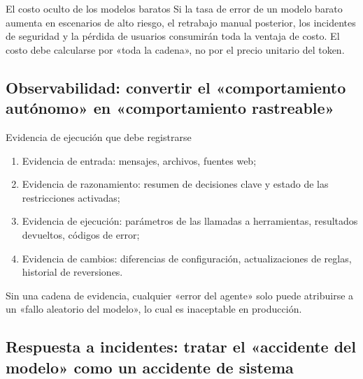 \begin{warningbox}{El costo oculto de los modelos baratos}
Si la tasa de error de un modelo barato aumenta en escenarios de alto riesgo, el retrabajo manual posterior, los incidentes de seguridad y la pérdida de usuarios consumirán toda la ventaja de costo. El costo debe calcularse por «toda la cadena», no por el precio unitario del token.
\end{warningbox}

\subsection{Observabilidad: convertir el «comportamiento autónomo» en «comportamiento rastreable»}

\begin{importantbox}{Evidencia de ejecución que debe registrarse}
\begin{enumerate}
    \item Evidencia de entrada: mensajes, archivos, fuentes web;
    \item Evidencia de razonamiento: resumen de decisiones clave y estado de las restricciones activadas;
    \item Evidencia de ejecución: parámetros de las llamadas a herramientas, resultados devueltos, códigos de error;
    \item Evidencia de cambios: diferencias de configuración, actualizaciones de reglas, historial de reversiones.
\end{enumerate}
\end{importantbox}

Sin una cadena de evidencia, cualquier «error del agente» solo puede atribuirse a un «fallo aleatorio del modelo», lo cual es inaceptable en producción.

\subsection{Respuesta a incidentes: tratar el «accidente del modelo» como un accidente de sistema}

